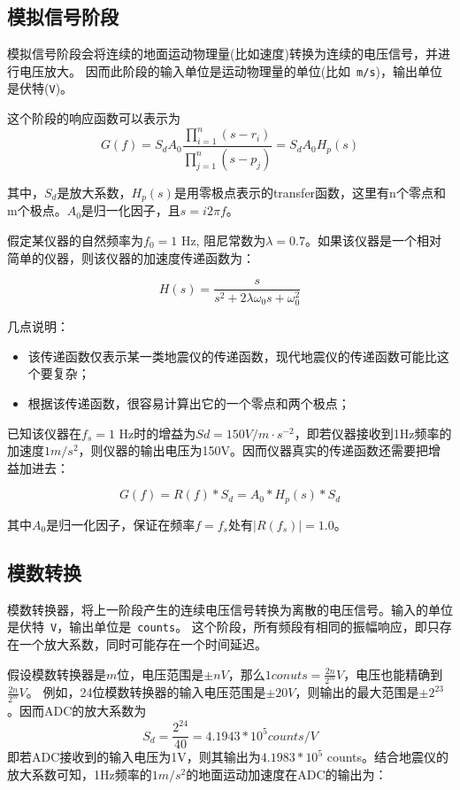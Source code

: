 \subsection{模拟信号阶段}
模拟信号阶段会将连续的地面运动物理量(比如速度)转换为连续的电压信号，并进行电压放大。
因而此阶段的输入单位是运动物理量的单位(比如~\verb+m/s+)，输出单位是伏特(\verb+V+)。

这个阶段的响应函数可以表示为
\[
    G(f)=S_d A_0 \frac{\prod_{i=1}^{n} (s-r_i)}{\prod_{j=1}^{n} (s-p_j)}=S_d A_0 H_p(s)
\]

其中，$S_d$是放大系数，$H_p(s)$是用零极点表示的transfer函数，这里有n个零点和m个极点。$A_0$是归一化因子，且$s=i 2\pi f$。

假定某仪器的自然频率为$f_0=1$ Hz, 阻尼常数为$\lambda=0.7$。如果该仪器是一个相对简单的仪器，则该仪器的加速度传递函数为：

\[
    H(s) = \frac{s}{s^2+2\lambda \omega_0 s + \omega_0^2}
\]

几点说明：
\begin{itemize}
\item 该传递函数仅表示某一类地震仪的传递函数，现代地震仪的传递函数可能比这个要复杂；
\item 根据该传递函数，很容易计算出它的一个零点和两个极点；
\end{itemize}

已知该仪器在$f_s=1$ Hz时的增益为$Sd=150 V/m \cdot s^{-2}$，即若仪器接收到1Hz频率的加速度$1 m/s^2$，则仪器的输出电压为150V。因而仪器真实的传递函数还需要把增益加进去：

\[
    G(f) = R(f)*S_d = A_0*H_p(s)*S_d
\]

其中$A_0$是归一化因子，保证在频率$f=f_s$处有$|R(f_s)|=1.0$。

\subsection{模数转换}
模数转换器，将上一阶段产生的连续电压信号转换为离散的电压信号。输入的单位是伏特~\verb+V+，输出单位是~\verb+counts+。
这个阶段，所有频段有相同的振幅响应，即只存在一个放大系数，同时可能存在一个时间延迟。

假设模数转换器是$m$位，电压范围是$\pm n V$，那么$1conuts=\frac{2n}{2^m} V$，电压也能精确到$\frac{2n}{2^m} V$。
例如，24位模数转换器的输入电压范围是$\pm 20 V$，则输出的最大范围是$\pm 2^{23}$。因而ADC的放大系数为
\[
    S_d = \frac{2^{24}}{40} = 4.1943*10^{5} counts/V
\]
即若ADC接收到的输入电压为1V，则其输出为$4.1983*10^5$ counts。结合地震仪的放大系数可知，1Hz频率的$1 m/s^2$的地面运动加速度在ADC的输出为：

